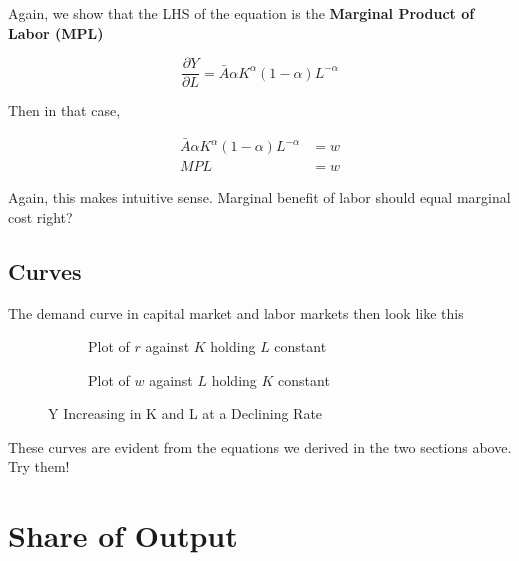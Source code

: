\documentclass[11pt]{scrartcl}
\begin{document}
Again, we show that the LHS of the equation is the \textbf{Marginal Product of Labor (MPL)}

\[ \frac{\partial Y}{\partial L} = \bar{A} \alpha K^{\alpha}(1-\alpha)L^{-\alpha} \]

Then in that case,

\begin{align*}
\bar{A} \alpha K^{\alpha}(1-\alpha)L^{-\alpha} &= w\\
MPL &= w
\end{align*}

Again, this makes intuitive sense. Marginal benefit of labor should equal marginal cost right?

\subsection{Curves}
The demand curve in capital market and labor markets then look like this

\begin{figure}[ht!]
\begin{subfigure}[b]{0.5\textwidth}
\caption{Plot of $r$ against $K$ holding $L$ constant}
\end{subfigure}
\hspace{2ex}
\begin{subfigure}[b]{0.5\textwidth}
\caption{Plot of $w$ against $L$ holding $K$ constant}
\end{subfigure}
\caption{Y Increasing in K and L at a Declining Rate}
\end{figure}

These curves are evident from the equations we derived in the two sections above. Try them!

\section{Share of Output}
\end{document}
